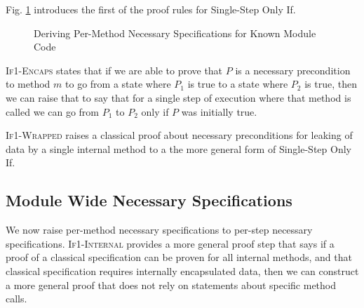 Fig. \ref{f:classical->singlestep} introduces the first of the proof 
rules for Single-Step Only If.
\begin{figure}[t]
\footnotesize
{}
\caption{Deriving Per-Method Necessary Specifications for Known Module Code}
\label{f:classical->singlestep}
\end{figure}

\textsc{If1-Encaps} states that if we are able to prove that $P$ is 
a necessary precondition to method $m$ to go from a state where 
$P_1$ is true to a state where $P_2$ is true, then we can raise 
that to say that for a single step of execution where that method 
is called we can go from $P_1$ to $P_2$ only if $P$ was initially true.

\textsc{If1-Wrapped} raises a classical proof about necessary preconditions 
for leaking of data by a single internal method to a the more general form of 
Single-Step Only If.

\subsection{Module Wide Necessary Specifications}
\label{s:module-proof}

We now raise per-method necessary specifications 
to per-step necessary specifications. \textsc{If1-Internal} provides a more general proof step that says
if a proof of a classical specification can be proven for all internal 
methods, and that classical specification requires internally encapsulated
data, then we can construct a more general proof that does not rely on
statements about specific method calls.

